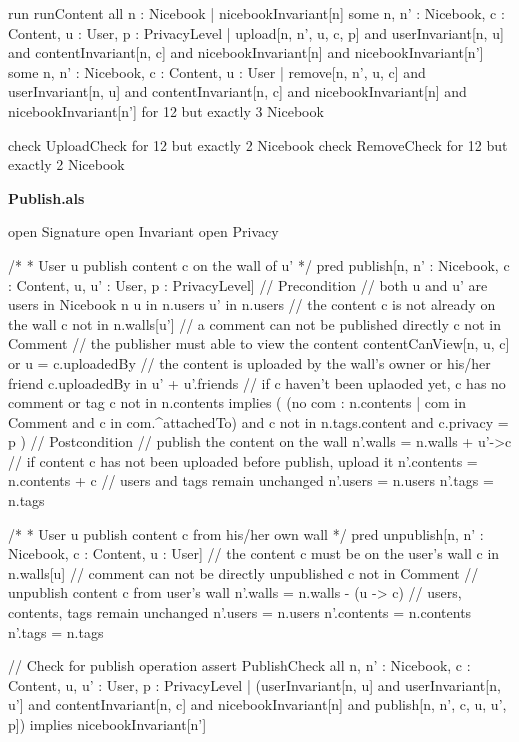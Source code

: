 \documentclass[titlepage]{article}
\begin{document}
\begin{alloy}
run runContent {
    all n : Nicebook | nicebookInvariant[n]
    some n, n' : Nicebook, c : Content, u : User, p : PrivacyLevel | 
        upload[n, n', u, c, p] and userInvariant[n, u] and contentInvariant[n, c] and 
        nicebookInvariant[n] and nicebookInvariant[n']
    some n, n' : Nicebook, c : Content, u : User | remove[n, n', u, c] and 
        userInvariant[n, u] and contentInvariant[n, c] and 
        nicebookInvariant[n] and nicebookInvariant[n']
} for 12 but exactly 3 Nicebook

check UploadCheck for 12 but exactly 2 Nicebook
check RemoveCheck for 12 but exactly 2 Nicebook
\end{alloy}
{\bf\large Publish.als}
\begin{alloy}
open Signature
open Invariant
open Privacy

/*
*	User u publish content c on the wall of u'
*/
pred publish[n, n' : Nicebook, c : Content, u, u' : User, p : PrivacyLevel] {
    // Precondition
    // both u and u' are users in Nicebook n
    u in n.users
    u' in n.users
    // the content c is not already on the wall 
    c not in n.walls[u']
    // a comment can not be published directly
    c not in Comment
    // the publisher must able to view the content
    contentCanView[n, u, c] or u = c.uploadedBy
    // the content is uploaded by the wall's owner or his/her friend
    c.uploadedBy in u' + u'.friends
    // if c haven't been uplaoded yet, c has no comment or tag
    c not in n.contents implies (
        (no com : n.contents | com in Comment and c in com.^attachedTo) and
        c not in n.tags.content and
        c.privacy = p
    )
    // Postcondition
    // publish the content on the wall
    n'.walls = n.walls + u'->c
    // if content c has not been uploaded before publish, upload it
    n'.contents = n.contents + c
    // users and tags remain unchanged
    n'.users = n.users
    n'.tags = n.tags
}

/*
*	User u publish content c from his/her own wall
*/
pred unpublish[n, n' : Nicebook, c : Content, u : User] {
    // the content c must be on the user's wall
    c in n.walls[u]
    // comment can not be directly unpublished
    c not in Comment
    // unpublish content c from user's wall
    n'.walls = n.walls - (u -> c)
    // users, contents, tags remain unchanged
    n'.users = n.users
    n'.contents = n.contents
    n'.tags = n.tags	
}

// Check for publish operation
assert PublishCheck {
    all n, n' : Nicebook, c : Content, u, u' : User, p : PrivacyLevel | 
        (userInvariant[n, u] and userInvariant[n, u'] and contentInvariant[n, c] and 
            nicebookInvariant[n] and publish[n, n', c, u, u', p]) implies 
                nicebookInvariant[n']
}


\end{alloy}
\end{document}
